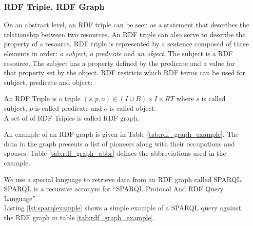 \subsubsection{RDF Triple, RDF Graph}
\label{sec:rdf_triples}
On an abstract level, an RDF triple can be seen as a statement that describes the relationship between two resources. An RDF triple can also serve to describe the property of a resource. RDF triple is represented by a sentence composed of three elements in order: \textit{a subject}, \textit{a predicate} and \textit{an object}.
The subject is a RDF resource. The subject has a property defined by the predicate and a value for that property set by the object.
RDF restricts which RDF terms can be used for subject, predicate and object:

\begin{definition}
An RDF Triple is a triple $(s, p, o) \in ( I \cup B ) \times I \times RT$ where $s$ is called subject, $p$ is called predicate and $o$ is called object. \\
A set of of RDF Triples is called RDF graph.
\end{definition}

\begin{example}
	An example of an RDF graph is given in Table \ref{tab:rdf_graph_example}. 
	The data in the graph presents a list of pioneers along with their occupations and spouses. Table \ref{tab:rdf_graph_abbr} defines the abbreviations used in the example. \\
\end{example}

We use a special language to retrieve data from an RDF graph called SPARQL. SPARQL \cite{Hitzler} is a recursive acronym for “SPARQL Protocol And RDF Query Language”. \\

Listing \ref{lst:sparqlexample} shows a simple example of a SPARQL query
against the RDF graph in table \ref{tab:rdf_graph_example}. \\

